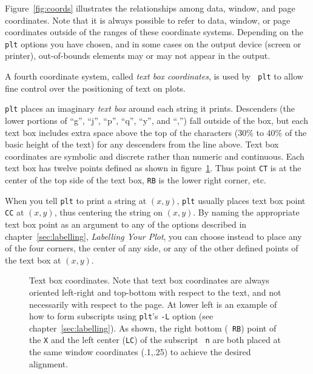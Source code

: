 \documentclass{book}
\begin{document}
Figure~\ref{fig:coords} illustrates the relationships among data, window, and
page coordinates.  Note that it is always possible to refer to data, window, or
page coordinates outside of the ranges of these coordinate systems.  Depending
on the {\tt plt} options you have chosen, and in some cases on the output
device (screen or printer), out-of-bounds elements may or may not appear in the
output.

%
A fourth coordinate system, called {\em text box coordinates}, is used by {\tt
plt} to allow fine control over the positioning of text on plots.

{\tt plt} places an imaginary {\em text box} around each string it prints.
Descenders (the lower portions of ``g'', ``j'', ``p'', ``q'', ``y'', and ``,'')
fall outside of the box, but each text box includes extra space above the top
of the characters (30\% to 40\% of the basic height of the text) for any
descenders from the line above.  Text box coordinates are symbolic and discrete
rather than numeric and continuous.  Each text box has twelve points defined as
shown in figure~\ref{fig:example8}.  Thus point {\tt CT} is at the center of
the top side of the text box, {\tt RB} is the lower right corner, etc.

When you tell {\tt plt} to print a string at $(x,y)$, {\tt plt} usually places
text box point {\tt CC} at $(x,y)$, thus centering the string on $(x,y)$.  By
naming the appropriate text box point as an argument to any of the options
described in chapter~\ref{sec:labelling}, {\em Labelling Your Plot}, you can
choose instead to place any of the four corners, the center of any side,
or any of the other defined points of the text box at $(x,y)$.

\begin{figure}
\begin{center}
\end{center}
%
\caption[Text box coordinates]{Text box coordinates. \label{fig:example8} Note
that text box coordinates are always oriented left-right and top-bottom with
respect to the text, and not necessarily with respect to the page.  At lower
left is an example of how to form subscripts using {\tt plt}'s {\tt -L}
option (see chapter~\ref{sec:labelling}).  As shown, the right bottom ({\tt
RB}) point of the {\tt X} and the left center ({\tt LC}) of the subscript {\tt
n} are both placed at the same window coordinates (.1,.25) to achieve the
desired alignment.}
\end{figure}
\end{document}
